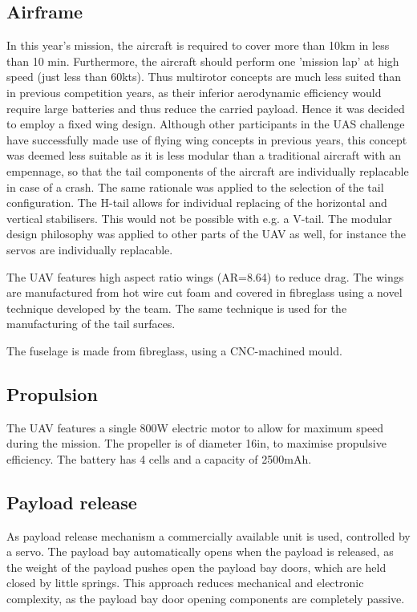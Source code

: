 \subsection{Airframe}
In this year's mission, the aircraft is required to cover more than 10km in less than 10 min. Furthermore, the aircraft should perform one 'mission lap' at high speed (just less than 60kts). Thus multirotor concepts are much less suited than in previous competition years, as their inferior aerodynamic efficiency would require large batteries and thus reduce the carried payload. Hence it was decided to employ a fixed wing design. Although other participants in the UAS challenge have successfully made use of flying wing concepts in previous years, this concept was deemed less suitable as it is less modular than a traditional aircraft with an empennage, so that the tail components of the aircraft are individually replacable in case of a crash. The same rationale was applied to the selection of the tail configuration. The H-tail allows for individual replacing of the horizontal and vertical stabilisers. This would not be possible with e.g. a V-tail. The modular design philosophy was applied to other parts of the UAV as well, for instance the servos are individually replacable.

The UAV features high aspect ratio wings (AR=8.64) to reduce drag. The wings are manufactured from hot wire cut foam and covered in fibreglass using a novel technique developed by the team. The same technique is used for the manufacturing of the tail surfaces.

The fuselage is made from fibreglass, using a CNC-machined mould. 

\subsection{Propulsion}
The UAV features a single 800W electric motor to allow for maximum speed during the mission. The propeller is of diameter 16in, to maximise propulsive efficiency. The battery has 4 cells and a capacity of 2500mAh.

\subsection{Payload release}
As payload release mechanism a commercially available unit is used, controlled by a servo. The payload bay automatically opens when the payload is released, as the weight of the payload pushes open the payload bay doors, which are held closed by little springs. This approach reduces mechanical and electronic complexity, as the payload bay door opening components are completely passive.

